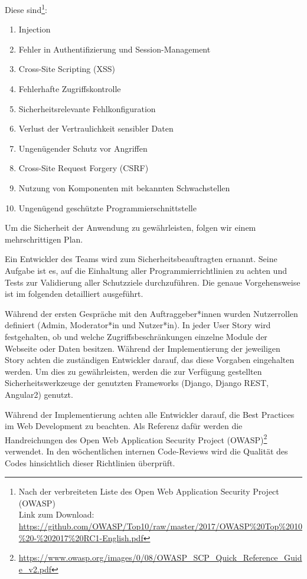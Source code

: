 \documentclass[accentcolor=tud0b,12pt,paper=a4]{tudreport}
\begin{document}
Diese sind\footnote{Nach der verbreiteten Liste des Open Web Application Security Project (OWASP) \\
	Link zum Download:  \href{https://github.com/OWASP/Top10/raw/master/2017/OWASP\%20Top\%2010\%20-\%202017\%20RC1-English.pdf}{https://github.com/OWASP/Top10/raw/master/2017/OWASP\%20Top\%2010\%20-\%202017\%20RC1-English.pdf}}:
\begin{enumerate}
\item Injection
\item Fehler in Authentifizierung und Session-Management
\item Cross-Site Scripting (XSS)
\item Fehlerhafte Zugriffskontrolle
\item Sicherheitsrelevante Fehlkonfiguration
\item Verlust der Vertraulichkeit sensibler Daten
\item Ungenügender Schutz vor Angriffen
\item Cross-Site Request Forgery (CSRF)
\item Nutzung von Komponenten mit bekannten Schwachstellen
\item Ungenügend geschützte Programmierschnittstelle
\end{enumerate}

Um die Sicherheit der Anwendung zu gewährleisten, folgen wir einem mehrschrittigen Plan. 

Ein Entwickler des Teams wird zum Sicherheitsbeauftragten ernannt. Seine Aufgabe ist es, auf die Einhaltung aller Programmierrichtlinien zu achten und Tests zur Validierung aller Schutzziele durchzuführen. Die genaue Vorgehensweise ist im folgenden detailliert ausgeführt.

Während der ersten Gespräche mit den Auftraggeber*innen wurden Nutzerrollen definiert (Admin, Moderator*in und Nutzer*in). In jeder User Story wird festgehalten, ob und welche Zugriffsbeschränkungen einzelne Module der Webseite oder Daten besitzen. Während der Implementierung der jeweiligen Story achten die zuständigen Entwickler darauf, das diese Vorgaben eingehalten werden. Um dies zu gewährleisten, werden die zur Verfügung gestellten Sicherheitswerkzeuge der genutzten Frameworks (Django, Django REST, Angular2) genutzt.

Während der Implementierung achten alle Entwickler darauf, die Best Practices im Web Development zu beachten. Als Referenz dafür werden die Handreichungen des Open Web Application Security Project (OWASP)\footnote{\href{https://www.owasp.org/images/0/08/OWASP_SCP_Quick_Reference_Guide_v2.pdf}{https://www.owasp.org/images/0/08/OWASP\_SCP\_Quick\_Reference\_Guide\_v2.pdf}} verwendet. In den wöchentlichen internen Code-Reviews wird die Qualität des Codes hinsichtlich dieser Richtlinien überprüft.
\end{document}
